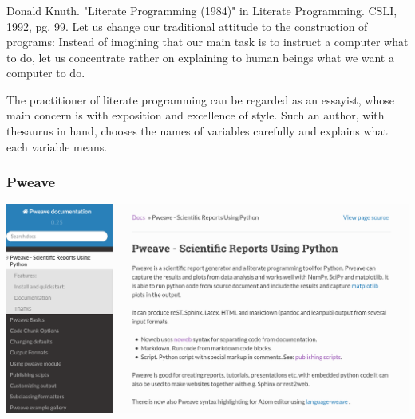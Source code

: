 \documentclass{beamer}
\begin{document}
\begin{frame}
  \frametitle{}
  \begin{center}
    \begin{block}
      {Donald Knuth. "Literate Programming (1984)" in Literate Programming. CSLI, 1992, pg. 99.}
      Let us change our traditional attitude to the construction of programs: Instead of imagining that our main task is to instruct a computer what to do, let us concentrate rather on explaining to human beings what we want a computer to do.
      
      The practitioner of literate programming can be regarded as an essayist, whose main concern is with exposition and excellence of style. Such an author, with thesaurus in hand, chooses the names of variables carefully and explains what each variable means.
    \end{block}
  \end{center}
\end{frame}

\begin{frame}
  \frametitle{Pweave}
  \begin{center}
    \includegraphics[width=\textwidth]{figs/pweave.png}
  \end{center}
\end{frame}
\end{document}
